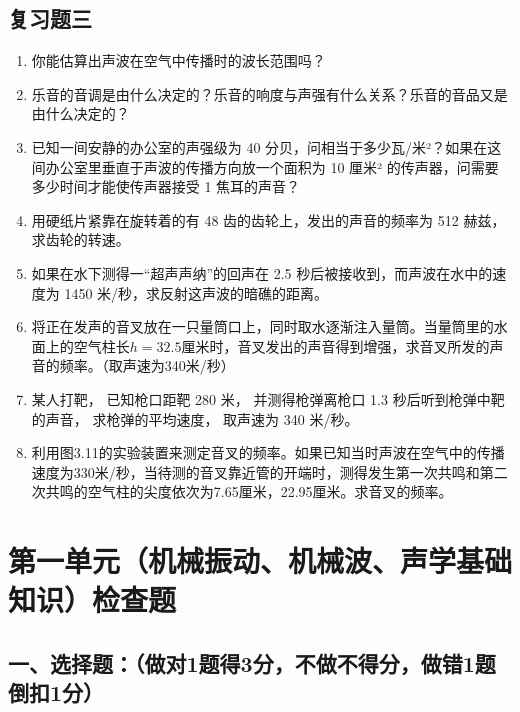 \section{复习题三}\label{ux590dux4e60ux9898ux4e09}

\begin{enumerate}
\def\labelenumi{\arabic{enumi}.}
\item
  你能估算出声波在空气中传播时的波长范围吗？
\item
  乐音的音调是由什么决定的？乐音的响度与声强有什么关系？乐音的音品又是由什么决定的？
\item
  已知一间安静的办公室的声强级为 40
  分贝，问相当于多少瓦/米²？如果在这间办公室里垂直于声波的传播方向放一个面积为
  10 厘米² 的传声器，问需要多少时间才能使传声器接受 1 焦耳的声音？
\item
  用硬纸片紧靠在旋转着的有 48 齿的齿轮上，发出的声音的频率为 512
  赫兹，求齿轮的转速。
\item
  如果在水下测得一``超声声纳''的回声在 2.5
  秒后被接收到，而声波在水中的速度为 1450
  米/秒，求反射这声波的暗礁的距离。
\item
  将正在发声的音叉放在一只量筒口上，同时取水逐渐注入量筒。当量筒里的水面上的空气柱长\(h = 32.5\)厘米时，音叉发出的声音得到增强，求音叉所发的声音的频率。（取声速为340米/秒）
\item
  某人打靶， 已知枪口距靶 280 米， 并测得枪弹离枪口 1.3
  秒后听到枪弹中靶的声音， 求枪弹的平均速度， 取声速为 340 米/秒。
\item
  利用图3.11的实验装置来测定音叉的频率。如果已知当时声波在空气中的传播速度为330米/秒，当待测的音叉靠近管的开端时，测得发生第一次共鸣和第二次共鸣的空气柱的尖度依次为7.65厘米，22.95厘米。求音叉的频率。
\end{enumerate}

\chapter{第一单元（机械振动、机械波、声学基础知识）检查题}\label{ux7b2cux4e00ux5355ux5143ux673aux68b0ux632fux52a8ux673aux68b0ux6ce2ux58f0ux5b66ux57faux7840ux77e5ux8bc6ux68c0ux67e5ux9898}

\section{一、选择题：（做对1题得3分，不做不得分，做错1题倒扣1分）}\label{ux4e00ux9009ux62e9ux9898ux505aux5bf91ux9898ux5f973ux5206ux4e0dux505aux4e0dux5f97ux5206ux505aux95191ux9898ux5012ux62631ux5206}


